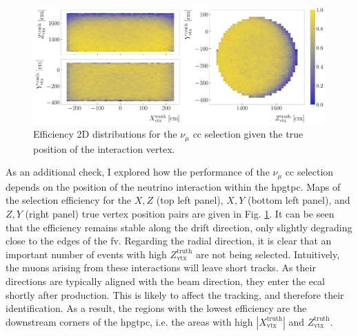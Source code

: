 \begin{figure}[t]
	\centering
	\includegraphics[width=.99\linewidth]{Images/GAr_selection/numuCC_selection_true_vertex_performance.pdf}
	\caption{Efficiency 2D distributions for the $\nu_{\mu}$ \gls{cc} selection given the true position of the interaction vertex.}
	\label{fig:numuCC_vertex_efficiency}
\end{figure}

As an additional check, I explored how the performance of the $\nu_{\mu}$ \gls{cc} selection depends on the position of the neutrino interaction within the \gls{hpgtpc}. Maps of the selection efficiency for the $X,Z$ (top left panel), $X,Y$ (bottom left panel), and $Z,Y$ (right panel) true vertex position pairs are given in Fig. \ref{fig:numuCC_vertex_efficiency}. It can be seen that the efficiency remains stable along the drift direction, only slightly degrading close to the edges of the \gls{fv}. Regarding the radial direction, it is clear that an important number of events with high $Z^{\mathrm{truth}}_{\mathrm{vtx}}$ are not being selected. Intuitively, the muons arising from these interactions will leave short tracks. As their directions are typically aligned with the beam direction, they enter the \gls{ecal} shortly after production. This is likely to affect the tracking, and therefore their identification. As a result, the regions with the lowest efficiency are the downstream corners of the \gls{hpgtpc}, i.e. the areas with high $|X^{\mathrm{truth}}_{\mathrm{vtx}}|$ and $Z^{\mathrm{truth}}_{\mathrm{vtx}}$.

